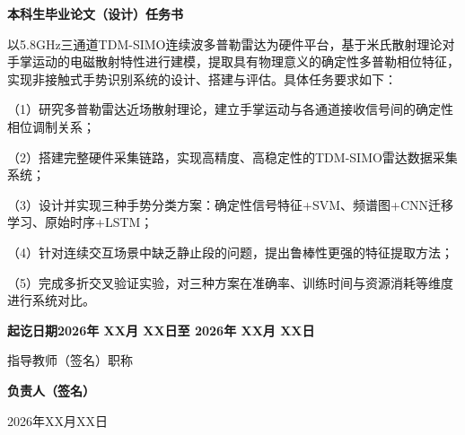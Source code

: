 {
\clearpage
{}
{}
}

\begin{center}
  \bfseries 本科生毕业论文（设计）任务书
\end{center}


\par
{}\par

以5.8GHz三通道TDM-SIMO连续波多普勒雷达为硬件平台，基于米氏散射理论对手掌运动的电磁散射特性进行建模，提取具有物理意义的确定性多普勒相位特征，实现非接触式手势识别系统的设计、搭建与评估。具体任务要求如下：

（1）研究多普勒雷达近场散射理论，建立手掌运动与各通道接收信号间的确定性相位调制关系；

（2）搭建完整硬件采集链路，实现高精度、高稳定性的TDM-SIMO雷达数据采集系统；

（3）设计并实现三种手势分类方案：确定性信号特征+SVM、频谱图+CNN迁移学习、原始时序+LSTM；

（4）针对连续交互场景中缺乏静止段的问题，提出鲁棒性更强的特征提取方法；

（5）完成多折交叉验证实验，对三种方案在准确率、训练时间与资源消耗等维度进行系统对比。

\vfill
{\bfseries
\noindent 起讫日期\hspace{1em}2026年 XX月 XX日至 2026年 XX月 XX日\vspace{0.5ex}\par
\hfill 指导教师（签名）{\underline{\makebox[7.5em][c]{}}}\hspace{0.5em}职称{\underline{}}\vspace{0.5ex}
}

\par
{}
{\bfseries
\hfill 负责人（签名）{\underline{\makebox[8em][c]{}}}\par
\hfill 2026年XX月XX日
}